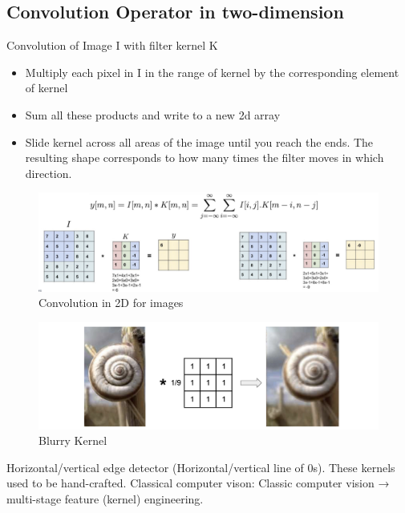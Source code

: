 \documentclass[11pt, english]{article}
\begin{document}
\subsection{Convolution Operator in two-dimension}
Convolution of Image I with filter kernel K
\begin{itemize}
    \item Multiply each pixel in I in the range of kernel by the corresponding element of kernel
    \item Sum all these products and write to a new 2d array
    \item Slide kernel across all areas of the image until you reach the ends.
    The resulting shape corresponds to how many times the filter moves in which direction.
\end{itemize}
\begin{figure}[H]
    \centering
    \includegraphics[width=0.8\linewidth]{kernel.png}
    \caption{Convolution in 2D for images}
    \label{fig:enter-label}
\end{figure}
\begin{figure}[H]
    \centering
    \includegraphics[width=0.7\linewidth]{blurry.png}
    \caption{Blurry Kernel}
    \label{fig:enter-label}
\end{figure}
Horizontal/vertical edge detector (Horizontal/vertical line of 0s).
These kernels used to be hand-crafted.
Classical computer vison: Classic computer vision → multi-stage feature (kernel) engineering.
\end{document}
